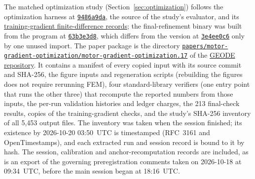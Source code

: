 \documentclass{anvil-paper}
\begin{document}
\begin{sloppypar}
The matched optimization study (Section~\ref{sec:optimization}) follows the
optimization harness at
\href{https://github.com/rjwalters/geode-fem/tree/9486a9da58beeca91968d4d3608f06b998abff45/benchmarks/motor_optimization}{\texttt{9486a9da}},
the source of the study's evaluator, and its
\href{https://github.com/rjwalters/geode-fem/tree/9486a9da58beeca91968d4d3608f06b998abff45/benchmarks/motor_optimization/runs}{training-gradient finite-difference records};
the final-refinement binary was built from the program at
\href{https://github.com/rjwalters/geode-fem/blob/63b3e3d8bbc30504f845eebb5b78e8be6a2ee12f/crates/geode-core/examples/icem_final_refinement.rs}{\texttt{63b3e3d8}},
which differs from the version at
\href{https://github.com/rjwalters/geode-fem/blob/3e4ee0c63a86dbf014a76c9faf04dd962da16911/crates/geode-core/examples/icem_final_refinement.rs}{\texttt{3e4ee0c6}}
only by one unused import.
The paper package is the directory
\href{https://github.com/rjwalters/geode-fem/tree/main/papers/motor-gradient-optimization/motor-gradient-optimization.17}{\texttt{papers/}\allowbreak\texttt{motor-gradient-optimization/}\allowbreak\texttt{motor-gradient-optimization.17}}
of the \href{https://github.com/rjwalters/geode-fem}{GEODE repository}. It
contains a manifest of every copied input with its source commit and
SHA-256, the figure inputs and regeneration scripts (rebuilding the figures
does not require rerunning FEM), four standard-library verifiers (one
entry point that runs the other three) that recompute the reported numbers
from those inputs, the per-run validation
histories and ledger charges, the 213 final-check results, copies of the
training-gradient checks, and the study's SHA-256 inventory of all 5,453
output files. The inventory was taken when the session finished; its
existence by 2026-10-20 03:50~UTC is timestamped (RFC~3161 and
OpenTimestamps), and each extracted run and session record is bound to it
by hash. The session, calibration and anchor-recomputation records are
included, as is an export of the governing preregistration comments taken
on 2026-10-18 at 09:34~UTC, before the main session began at 18:16~UTC.
\end{sloppypar}
\end{document}
